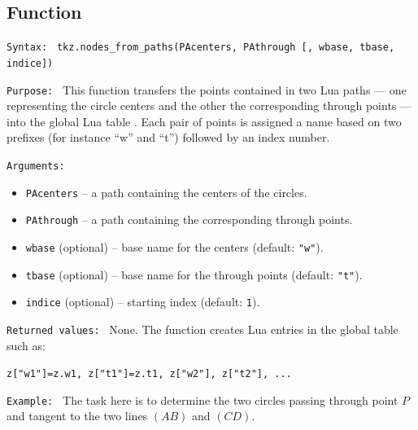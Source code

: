 \subsection{Function }
\label{sub:tkz_nodes_from_paths}

\texttt{Syntax: }
\verb|tkz.nodes_from_paths(PAcenters, PAthrough [, wbase, tbase, indice])|

\texttt{Purpose: }
This function transfers the points contained in two Lua paths — one representing the circle centers and the other the corresponding through points — into the global Lua table .
Each pair of points is assigned a name based on two prefixes (for instance ``w'' and ``t'') followed by an index number.

\texttt{Arguments: }
\begin{itemize}
  \item \verb|PAcenters| – a path containing the centers of the circles.
  \item \verb|PAthrough| – a path containing the corresponding through points.
  \item \verb|wbase| (optional) – base name for the centers (default: \verb|"w"|).
  \item \verb|tbase| (optional) – base name for the through points (default: \verb|"t"|).
  \item \verb|indice| (optional) – starting index (default: \verb|1|).
\end{itemize}

\texttt{Returned values: }
None.
The function creates Lua entries in the global table  such as:

\verb|z["w1"]=z.w1, z["t1"]=z.t1, z["w2"], z["t2"], ...|

\texttt{Example: } The task here is to determine the two circles passing through point $P$ and tangent to the two lines $(AB)$ and $(CD)$.

\begin{tkzexample}[latex=.5\textwidth]
 \end{tkzexample}

